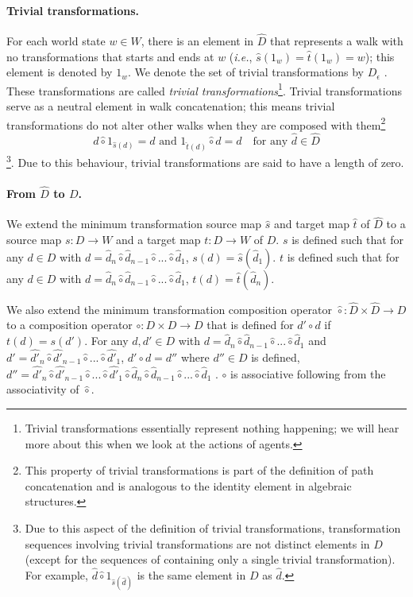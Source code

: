 \paragraph{Trivial transformations.}
For each world state $w \in W$, there is an element in $\hat{D}$ that represents a walk with no transformations that starts and ends at $w$ (\textit{i.e.}, $\hat{s}(1_{w}) = \hat{t}(1_{w}) = w$); this element is denoted by $1_{w}$.
We denote the set of trivial transformations by $D_{\epsilon}$ .
These transformations are called \emph{trivial transformations}\footnote{Trivial transformations essentially represent nothing happening; we will hear more about this when we look at the actions of agents.}.
Trivial transformations serve as a neutral element in walk concatenation; this means trivial transformations do not alter other walks when they are composed with them\footnote{This property of trivial transformations is part of the definition of path concatenation and is analogous to the identity element in algebraic structures.}
\begin{equation}
    d \hat{\circ} 1_{\hat{s}(d)} = d \text{ and } 1_{\hat{t}(d)} \hat{\circ} d = d \quad \text{for any $\hat{d} \in \hat{D}$}
\end{equation}
 \footnote{Due to this aspect of the definition of trivial transformations, transformation sequences involving trivial transformations are not distinct elements in $D$ (except for the sequences of containing only a single trivial transformation).
	For example, $\hat{d} \hat{\circ} 1_{\hat{s}(\hat{d})}$ is the same element in $D$ as $\hat{d}$.}.
Due to this behaviour, trivial transformations are said to have a length of zero.

\paragraph{From $\hat{D}$ to $D$.}
We extend the minimum transformation source map $\hat{s}$ and target map $\hat{t}$ of $\hat{D}$ to a source map $s: D \to W$ and a target map $t: D \to W$ of $D$.
$s$ is defined such that for any $d \in D$ with $d = \hat{d}_{n} \hat{\circ} \hat{d}_{n-1} \hat{\circ} ... \hat{\circ} \hat{d}_{1}$, $s(d) = \hat{s}(\hat{d}_{1})$.
$t$ is defined such that for any $d \in D$ with $d = \hat{d}_{n} \hat{\circ} \hat{d}_{n-1} \hat{\circ} ... \hat{\circ} \hat{d}_{1}$, $t(d) = \hat{t}(\hat{d}_{n})$.

We also extend the minimum transformation composition operator $\hat{\circ}: \hat{D} \times \hat{D} \to D$ to a composition operator $\circ: D \times D \to D$ that is defined for $d' \circ d$ if $t(d) = s(d')$.
For any $d, d' \in D$ with $d = \hat{d}_{n} \hat{\circ} \hat{d}_{n-1} \hat{\circ} ... \hat{\circ} \hat{d}_{1}$ and $d' = \hat{d'}_{n} \hat{\circ} \hat{d'}_{n-1} \hat{\circ} ... \hat{\circ} \hat{d'}_{1}$, $d' \circ d = d''$ where $d'' \in D$ is defined, $d'' = \hat{d'}_{n} \hat{\circ} \hat{d'}_{n-1} \hat{\circ} ... \hat{\circ} \hat{d'}_{1} \hat{\circ} \hat{d}_{n} \hat{\circ} \hat{d}_{n-1} \hat{\circ} ... \hat{\circ} \hat{d}_{1}$ .
$\circ$ is associative following from the associativity of $\hat{\circ}$.

